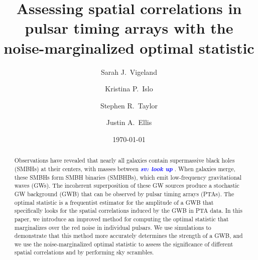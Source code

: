 \documentclass[twocolumn,aps,prd,superscriptaddress]{revtex4-1}
\newcommand{\sv}[1]{\textcolor{blue}{\it{\textbf{sv: #1}}} }
\begin{document}
\title{Assessing spatial correlations in pulsar timing arrays with the noise-marginalized optimal statistic}


\author{Sarah J.\ Vigeland}

\author{Kristina P.\ Islo}

\author{Stephen R.\ Taylor}

\author{Justin A.\ Ellis}


\date{\today}  

\begin{abstract}
Observations have revealed that nearly all galaxies contain supermassive black holes (SMBHs) at their centers, 
with masses between \sv{look up}. 
When galaxies merge, these SMBHs form SMBH binaries (SMBHBs), 
which emit low-frequency gravitational waves (GWs). 
The incoherent superposition of these GW sources produce a stochastic GW background (GWB) 
that can be observed by pulsar timing arrays (PTAs). 
The optimal statistic is a frequentist estimator for the amplitude of a GWB 
that specifically looks for the spatial correlations induced by the GWB in PTA data. 
In this paper, we introduce an improved method for computing the optimal statistic 
that marginalizes over the red noise in individual pulsars. 
We use simulations to demonstrate that this method 
more accurately determines the strength of a GWB, 
and we use the noise-marginalized optimal statistic to assess the 
significance of different spatial correlations and 
by performing sky scrambles.
\end{abstract}
\end{document}
